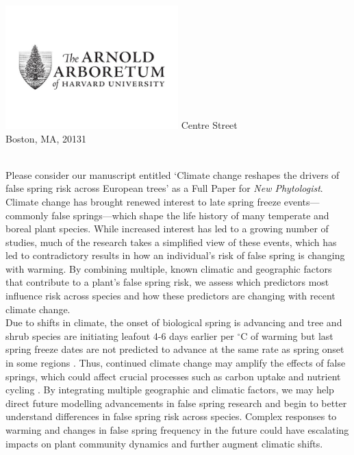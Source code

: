 \documentclass[11pt,a4paper]{article}\usepackage[]{graphicx}\usepackage[]{color}
\begin{document}
\includegraphics[width=0.5\textwidth, right]{AA_logo.jpg}
 Centre Street\\
\noindent Boston, MA, 20131\\


\vspace{1.5ex}




\vspace{3ex}\\
\noindent Please consider our manuscript entitled `Climate change reshapes the drivers of false spring risk across European trees' as a Full Paper for \textit{New Phytologist}. Climate change has brought renewed interest to late spring freeze events---commonly false springs---which shape the life history of many temperate and boreal plant species. While increased interest has led to a growing number of studies, much of the research takes a simplified view of these events, which has led to contradictory results in how an individual's risk of false spring is changing with warming. By combining multiple, known climatic and geographic factors that contribute to a plant's false spring risk, we assess which predictors most influence risk across species and how these predictors are changing with recent climate change.  \\

\noindent Due to shifts in climate, the onset of biological spring is advancing and tree and shrub species are initiating leafout 4-6 days earlier per $^{\circ}$C of warming \citep{Wolkovich2012, Polgar2014, Fu2015} but last spring freeze dates are not predicted to advance at the same rate as spring onset in some regions \citep{Inouye2008,Martin2010,Labe2016,Wypych2016a,Sgubin2018}. Thus, continued climate change may amplify the effects of false springs, which could affect crucial processes such as carbon uptake and nutrient cycling \citep{Hufkens2012,Richardson2013,Klosterman2018}. By integrating multiple geographic and climatic factors, we may help direct future modelling advancements in false spring research and begin to better understand differences in false spring risk across species. Complex responses to warming and changes in false spring frequency in the future could have escalating impacts on plant community dynamics and further augment climatic shifts. \\
\end{document}
